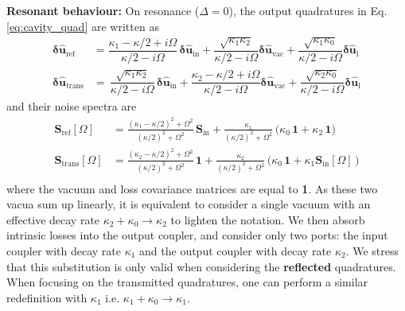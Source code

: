 \noindent \textbf{Resonant behaviour: } On resonance ($\Delta=0$), the output quadratures in Eq. \eqref{eq:cavity_quad} are written as 
\begin{equation}
  \begin{split}
  \mathbf{\delta \hat{u}_{\mathrm{ref}}}   &= \dfrac{\kappa_1-\kappa/2+i\Omega}{\kappa/2-i\Omega}  \,  \mathbf{\delta \hat{u}_{\mathrm{in}}}   +   \dfrac{\sqrt{\kappa_1 \kappa_2} }{\kappa/2-i\Omega}  \mathbf{\delta \hat{u}_{\mathrm{vac}}} + \dfrac{\sqrt{\kappa_1 \kappa_0} }{\kappa/2-i\Omega}  \mathbf{\delta \hat{u}_{\mathrm{l}}}  \\
  \mathbf{\delta \hat{u}_{\mathrm{trans}}}   &= \, \dfrac{ \sqrt{\kappa_1 \kappa_2}}{\kappa/2-i\Omega}  \, \mathbf{\delta \hat{u}_{\mathrm{in}}} +  \dfrac{\kappa_2-\kappa/2+i\Omega}{\kappa/2-i\Omega}   \mathbf{\delta \hat{u}_{\mathrm{vac}}}   + \dfrac{\sqrt{\kappa_2 \kappa_0} }{\kappa/2-i\Omega}  \mathbf{\delta \hat{u}_{\mathrm{l}}}
  \end{split}
\end{equation}
and their noise spectra are 
\begin{equation}
  \begin{split}
   \mathbf{S}_{\mathrm{ref}}[\Omega] & =\frac{(\kappa_1-\kappa/2)^2+\Omega^2}{(\kappa/2)^2+\Omega^2}\,\mathbf{S}_{\mathrm{in}}+\frac{\kappa_1}{(\kappa/2)^2+\Omega^2}\,\Big(\kappa_0 \,\mathbf{1} + \kappa_2 \, \mathbf{1}\Big) \\ 
     \mathbf{S}_{\mathrm{trans}}[\Omega] & =\frac{(\kappa_2-\kappa/2)^2+\Omega^2}{(\kappa/2)^2+\Omega^2}\,\mathbf{1}+\frac{\kappa_2}{(\kappa/2)^2+\Omega^2}\,\Big(\kappa_0 \, \mathbf{1}+\kappa_1 \mathbf{S}_{\mathrm{in}} [\Omega]\,\Big) \\ 
   \end{split}
  \label{eq:MCIR}
\end{equation}
where the vacuum and loss covariance matrices are equal to \textbf{1}. As these two vacua sum up linearly, it is equivalent to consider a single vacuum with an effective decay rate $\kappa_2 + \kappa_0 \rightarrow \kappa_2$ to lighten the notation. We then absorb intrinsic losses into the output coupler, and consider only two ports: the input coupler with decay rate $\kappa_1$ and the output coupler with decay rate $\kappa_2$. We stress that this substitution is only valid when considering the \textbf{reflected} quadratures. When focusing on the transmitted quadratures, one can perform a similar redefinition with $\kappa_1$ i.e. $\kappa_1 + \kappa_0 \rightarrow \kappa_1$. \\ 

